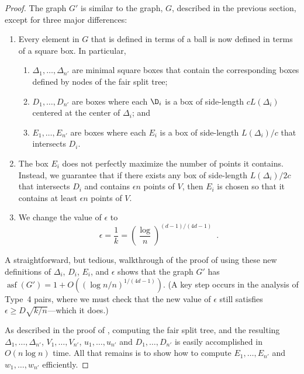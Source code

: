 \documentclass{patmorin}
\DeclareMathOperator{\asf}{asf}
\begin{document}
\begin{proof}
  The graph $G'$ is similar to the graph, $G$, described in the previous
  section, except for three major differences:
  \begin{enumerate}
     \item Every element in $G$ that is defined in terms of a ball is
     now defined in terms of a square box.  In particular,
     \begin{enumerate}
       \item $\Delta_1,\ldots,\Delta_{n'}$ are minimal square boxes that contain
         the corresponding boxes defined by nodes of the fair split tree;
       \item $D_1,\ldots,D_{n'}$ are boxes where each $\D_i$ is a box of
         side-length $cL(\Delta_i)$ centered at the center of $\Delta_i$;
         and
       \item $E_1,\ldots,E_{n'}$ are boxes where each $E_i$ is a box of
         side-length $L(\Delta_i)/c$ that intersects $D_i$.
     \end{enumerate}
     \item The box $E_i$ does not perfectly maximize the number of points
       it contains. Instead, we guarantee that if there exists any
       box of side-length $L(\Delta_i)/2c$ that intersects $D_i$ and
       contains $\epsilon n$ points of $V$, then $E_i$ is chosen so that
       it contains at least $\epsilon n$ points of $V$.
     \item We change the value of $\epsilon$ to 
      \[  \epsilon = \frac{1}{k} = \left(\frac{\log}{n}\right)^{(d-1)/(4d-1)} \enspace . \]
  \end{enumerate} 
  A straightforward, but tedious, walkthrough of the proof of
   using these new definitions of $\Delta_i$,
  $D_i$, $E_i$, and $\epsilon$ shows that the graph $G'$ has $\asf(G')=
  1+O((\log n/n)^{1/(4d-1)})$.  (A key step occurs in the analysis of
  Type~4 pairs, where we must check that the new value of $\epsilon$
  still satisfies $\epsilon \ge D\sqrt{k/n}$---which it does.)

  As described in the proof of , computing the
  fair split tree, and the resulting $\Delta_1,\ldots,\Delta_{n'}$,
  $V_1,\ldots,V_{n'}$, $u_1,\ldots,u_{n'}$ and $D_1,\ldots,D_{n'}$ is
  easily accomplished in $O(n\log n)$ time.  All that remains is to show
  how to compute $E_1,\ldots,E_{n'}$ and $w_1,\ldots,w_{n'}$ efficiently.


\end{proof}
\end{document}
